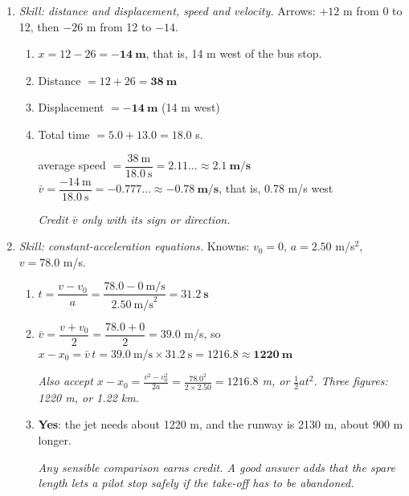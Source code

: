 \documentclass[12pt, twoside]{article}
\begin{document}
\begin{enumerate}[itemsep=0.5cm]
  Step 2, convert, carrying the unrounded value: \quad
  $2717.39\ldots~\text{s} \times \dfrac{1~\text{min}}{60~\text{s}} = 45.28\ldots
  \approx \mathbf{45~\textbf{min}}$

  \emph{Two figures, from 4.6.}

\item \emph{Skill: distance and displacement, speed and velocity.} Arrows: $+12$ m
  from 0 to 12, then $-26$ m from 12 to $-14$.
  \begin{enumerate}[itemsep=0.3cm]
    \item $x = 12 - 26 = \mathbf{-14~\textbf{m}}$, that is, 14 m west of the bus
      stop.
    \item Distance $= 12 + 26 = \mathbf{38~\textbf{m}}$
    \item Displacement $= \mathbf{-14~\textbf{m}}$ (14 m west)
    \item Total time $= 5.0 + 13.0 = 18.0$ s.

      average speed $= \dfrac{38~\text{m}}{18.0~\text{s}} = 2.11\ldots \approx
      \mathbf{2.1~\textbf{m/s}}$ \qquad
      $\bar{v} = \dfrac{-14~\text{m}}{18.0~\text{s}} = -0.777\ldots \approx
      \mathbf{-0.78~\textbf{m/s}}$, that is, 0.78 m/s west

      \emph{Credit $\bar{v}$ only with its sign or direction.}
  \end{enumerate}

\item \emph{Skill: constant-acceleration equations.} Knowns: $v_0 = 0$,
  $a = 2.50$ m/s$^2$, $v = 78.0$ m/s.
  \begin{enumerate}[itemsep=0.3cm]
    \item $t = \dfrac{v - v_0}{a} = \dfrac{78.0 - 0~\text{m/s}}{2.50~\text{m/s}^2} =
      \mathbf{31.2~\textbf{s}}$
    \item $\bar{v} = \dfrac{v + v_0}{2} = \dfrac{78.0 + 0}{2} = 39.0$ m/s, so
      $x - x_0 = \bar{v}\,t = 39.0~\text{m/s} \times 31.2~\text{s} = 1216.8
      \approx \mathbf{1220~\textbf{m}}$

      \emph{Also accept $x - x_0 = \frac{v^2 - v_0^2}{2a} = \frac{78.0^2}{2 \times
      2.50} = 1216.8$ m, or $\frac{1}{2}at^2$. Three figures: 1220 m, or 1.22 km.}
    \item \textbf{Yes}: the jet needs about 1220 m, and the runway is 2130 m, about
      900 m longer.

      \emph{Any sensible comparison earns credit. A good answer adds that the spare
      length lets a pilot stop safely if the take-off has to be abandoned.}
  \end{enumerate}


\end{enumerate}
\end{document}
